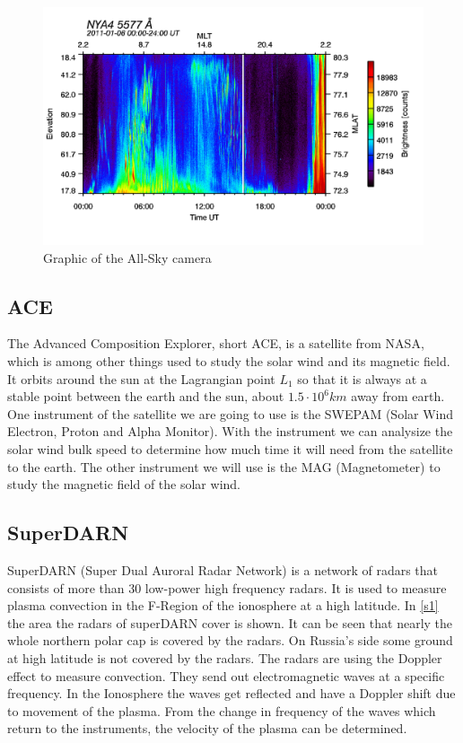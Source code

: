 \documentclass[10pt,a4paper]{article}
\begin{document}
\begin{figure}[h]
	\includegraphics[scale = 0.25]{am_0024_5577.png}
	\centering
	\caption{Graphic of the All-Sky camera}
	\label{a1}
\end{figure}

\subsection{ACE}

The Advanced Composition Explorer, short ACE, is a satellite from NASA, which is among other things used to study the solar wind and its magnetic field. It orbits around the sun at the Lagrangian point $L_1$ so that it is always at a stable point between the earth and the sun, about $1.5 \cdot 10^6 km$ away from earth. 
One instrument of the satellite we are going to use is the SWEPAM (Solar Wind Electron, Proton and Alpha Monitor). With the instrument we can analysize the solar wind bulk speed to determine how much time it will need from the satellite to the earth. 
The other instrument we will use is the MAG (Magnetometer) to study the magnetic field of the solar wind.


\subsection{SuperDARN}

SuperDARN (Super Dual Auroral Radar Network) is a network of radars that consists of more than 30 low-power high frequency radars. It is used to measure plasma convection in the F-Region of the ionosphere at a high latitude. In \ref{s1} the area the radars of superDARN cover is shown. It can be seen that nearly the whole northern polar cap is covered by the radars. On Russia's side some ground at high latitude is not covered by the radars.
The radars are using the Doppler effect to measure convection. They send out electromagnetic waves at a specific frequency. In the Ionosphere the waves get reflected and have a Doppler shift due to movement of the plasma. From the change in frequency of the waves which return to the instruments, the velocity of the plasma can be determined.
\end{document}
